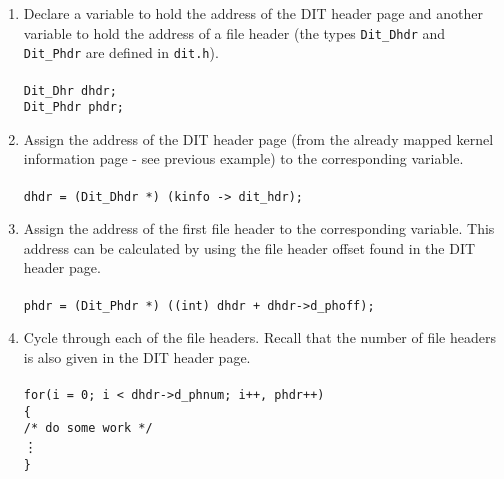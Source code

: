 \begin{enumerate}

\item Declare a variable to hold the address of the DIT header page
  and another variable to hold the address of a file header (the types
  {\footnotesize\verb+Dit_Dhdr+} and {\footnotesize\verb+Dit_Phdr+} are defined in {\footnotesize\verb+dit.h+}).\\ \\
  \hspace*{20pt} {\footnotesize\verb+Dit_Dhr dhdr;+} \\
  \hspace*{20pt} {\footnotesize\verb+Dit_Phdr phdr;+}
  
\item Assign the address of the DIT header page (from the already
  mapped kernel information page - see previous example) to the
  corresponding variable. \\ \\
  \hspace*{20pt} {\footnotesize\verb+dhdr = (Dit_Dhdr *) (kinfo -> dit_hdr);+}
  
\item Assign the address of the first file header to the corresponding
  variable. This address can be calculated by using the file header
  offset found in the DIT header page. \\ \\
  \hspace*{20pt} \verb`phdr = (Dit_Phdr *) ((int) dhdr + dhdr->d_phoff);`
  
\item Cycle through each of the file headers. Recall that the number
  of file headers is also given in the DIT header page. \\ \\
  \hspace*{20pt} \verb`for(i = 0; i < dhdr->d_phnum; i++, phdr++)` \\
  \hspace*{20pt} {\footnotesize\verb+{+} \\
    \hspace*{50pt} {\footnotesize\verb+/* do some work */+} \\
    \hspace*{85pt} \vdots \\
    \hspace*{20pt} {\footnotesize\verb+}+}

\end{enumerate}


